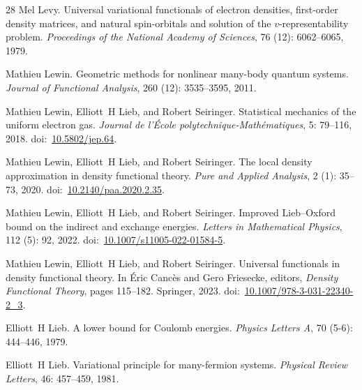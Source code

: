 \documentclass[final,reqno]{amsart}
\theoremstyle{remark}
\begin{document}
\begin{thebibliography}{28}
Mel Levy.
\newblock Universal variational functionals of electron densities, first-order
  density matrices, and natural spin-orbitals and solution of the
  $v$-representability problem.
\newblock \emph{Proceedings of the National Academy of Sciences}, 76
  (12): 6062--6065, 1979.

Mathieu Lewin.
\newblock Geometric methods for nonlinear many-body quantum systems.
\newblock \emph{Journal of Functional Analysis}, 260 (12):
  3535--3595, 2011.

Mathieu Lewin, Elliott~H Lieb, and Robert Seiringer.
\newblock Statistical mechanics of the uniform electron gas.
\newblock \emph{Journal de l'{\'E}cole polytechnique-Math{\'e}matiques},
  5: 79--116, 2018.
\newblock doi:~\href{https://doi.org/10.5802/jep.64}{10.5802/jep.64}.

Mathieu Lewin, Elliott~H Lieb, and Robert Seiringer.
\newblock The local density approximation in density functional theory.
\newblock \emph{Pure and Applied Analysis}, 2 (1): 35--73,
  2020.
\newblock doi:~\href{https://doi.org/10.2140/paa.2020.2.35}{10.2140/paa.2020.2.35}.

Mathieu Lewin, Elliott~H Lieb, and Robert Seiringer.
\newblock Improved {L}ieb--{O}xford bound on the indirect and exchange
  energies.
\newblock \emph{Letters in Mathematical Physics}, 112 (5):
  92, 2022.
\newblock doi:~\href{https://doi.org/10.1007/s11005-022-01584-5}{10.1007/s11005-022-01584-5}.

Mathieu Lewin, Elliott~H Lieb, and Robert Seiringer.
\newblock Universal functionals in density functional theory.
\newblock In {\'E}ric Canc{\`e}s and Gero Friesecke, editors, \emph{Density
  Functional Theory}, pages 115--182. Springer, 2023.
\newblock doi:~\href{https://doi.org/10.1007/978-3-031-22340-2_3}{10.1007/978-3-031-22340-2\_3}.

Elliott~H Lieb.
\newblock A lower bound for {C}oulomb energies.
\newblock \emph{Physics Letters A}, 70 (5-6): 444--446, 1979.

Elliott~H Lieb.
\newblock Variational principle for many-fermion systems.
\newblock \emph{Physical Review Letters}, 46: 457--459, 1981.


\end{thebibliography}
\end{document}
